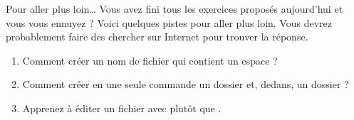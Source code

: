 \documentclass[a4paper,11pt]{style-esi/td}
\begin{document}
	\begin{Exercice}{Pour aller plus loin\dots}
		Vous avez fini tous les exercices proposés aujourd'hui
		et vous vous ennuyez ?
		Voici quelques pistes pour aller plus loin.
		Vous devrez probablement faire des chercher sur Internet
		pour trouver la réponse.
		\begin{enumerate}
		\item 
			Comment créer un nom de fichier qui contient un espace ?
		\item 
			Comment créer en une seule commande un dossier 
			et, dedans, un dossier  ?
		\item 
			Apprenez à éditer un fichier avec  plutôt que .
		\end{enumerate}
	\end{Exercice}
\end{document}
